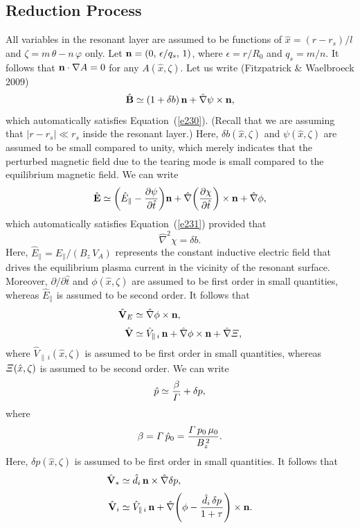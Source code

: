 \documentclass[notitlepage,12pt]{article}
\begin{document}
\subsection{Reduction Process} 
All variables in the resonant layer are assumed to be functions of $\hat{x}=(r-r_s)/l$ and $\zeta=m\,\theta-n\,\varphi$ only. 
Let ${\bf n} = (0,\,\epsilon/q_s,\,1)$, where $\epsilon=r/R_0$ and $q_s=m/n$. It follows that ${\bf n}\cdot\nabla A=0$ for any $A(\hat{x},\zeta)$. 
Let us write (Fitzpatrick \& Waelbroeck 2009)
\begin{equation}\label{e238}
\hat{\bf B} \simeq (1+ \delta b)\,{\bf n} + \hat{\nabla}\psi\times {\bf n},
\end{equation}
which automatically satisfies Equation~(\ref{e230}). (Recall that we are assuming that $|r-r_s|\ll r_s$ inside the resonant layer.) Here, $\delta b(\hat{x},\zeta)$ and $\psi(\hat{x},\zeta)$ are assumed to be small
compared to unity, which merely indicates that the perturbed magnetic field due to the tearing mode is small compared to the
equilibrium magnetic field.  We can write
\begin{equation}
\hat{\bf E} \simeq \left(\hat{E}_\parallel- \frac{\partial \psi}{\partial \hat{t}}\right)\!{\bf n} + \hat{\nabla}\!\left(\frac{\partial\chi}{\partial \hat{t}}\right)\times {\bf n} + \hat{\nabla}\phi,
\end{equation}
which automatically satisfies Equation~(\ref{e231}) provided that
\begin{equation}
\hat{\nabla}^2\chi =\delta b.
\end{equation}
Here, $\hat{E}_\parallel = E_\parallel/(B_z\,V_A)$ represents the constant inductive electric field that drives the equilibrium plasma current in the vicinity of the resonant surface. Moreover, $\partial/\partial \hat{t}$ and $\phi(\hat{x},\zeta)$
are 
assumed to be first order in small quantities, whereas $\hat{E}_\parallel$ is assumed to be second order. 
It follows that
\begin{align}
\hat{\bf V}_E &\simeq \hat{\nabla}\phi\times {\bf n},\\[0.5ex]
\hat{\bf V} &\simeq \hat{V}_{\parallel\,i}\,{\bf n}+  \hat{\nabla}\phi\times {\bf n}+\hat{\nabla}{\mit\Xi},
\end{align}
where $\hat{V}_{\parallel\,i}(\hat{x},\zeta)$ is assumed to be first order in small quantities, whereas ${\mit\Xi}(\hat{x},\zeta)$ is assumed to be
second order. 
We can write
\begin{equation}
\hat{p}\simeq  \frac{\beta}{{\mit\Gamma}} + \delta p,
\end{equation}
where 
\begin{equation}\label{e244}
\beta= {\mit\Gamma}\,\hat{p}_0= \frac{{\mit\Gamma}\,p_0\,\mu_0}{B_z^{\,2}}.
\end{equation}
 Here, $\delta p(\hat{x},\zeta)$ is assumed to be first order in small
quantities. 
It follows that
\begin{align}
\hat{\bf V}_\ast &\simeq \hat{d}_i\,{\bf n}\times \hat{\nabla} \delta p,\\[0.5ex]
\hat{\bf V}_i&\simeq  \hat{V}_{\parallel\,i} \,{\bf n}+ \hat{\nabla}\!\left(\phi - \frac{\hat{d}_i\,\delta p}{1+\tau}\right)\times {\bf n}.
\end{align}
\end{document}
